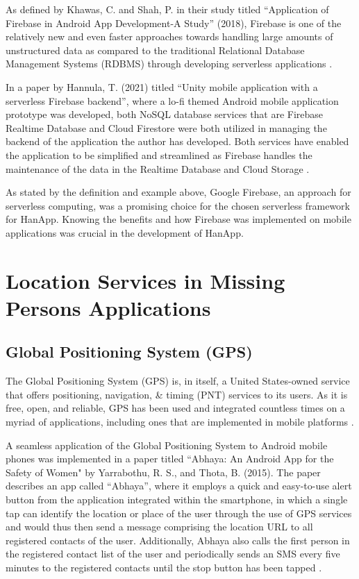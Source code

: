 As defined by Khawas, C. and Shah, P. in their study titled “Application of Firebase in Android App Development-A Study” (2018), Firebase is one of the relatively new and even faster approaches towards handling large amounts of unstructured data as compared to the traditional Relational Database Management Systems (RDBMS) through developing serverless applications 
\cite{khawas2018application}.

In a paper by Hannula, T. (2021) titled “Unity mobile application with a serverless Firebase backend”, where a lo-fi themed Android mobile application prototype was developed, both NoSQL database services that are Firebase Realtime Database and Cloud Firestore were both utilized in managing the backend of the application the author has developed. Both services have enabled the application to be simplified and streamlined as Firebase handles the maintenance of the data in the Realtime Database and Cloud Storage \cite{hannula2021unity}.

As stated by the definition and example above, Google Firebase, an approach for serverless computing, was a promising choice for the chosen serverless framework for HanApp. Knowing the benefits and how Firebase was implemented on mobile applications was crucial in the development of HanApp.


\section{Location Services in Missing Persons Applications}

\subsection{Global Positioning System (GPS)}

The Global Positioning System (GPS) is, in itself, a United States-owned service that offers positioning, navigation, \& timing (PNT) services to its users. As it is free, open, and reliable, GPS has been used and integrated countless times on a myriad of applications, including ones that are implemented in mobile platforms \cite{gpsGov}.

A seamless application of the Global Positioning System to Android mobile phones was implemented in a paper titled “Abhaya: An Android App for the Safety of Women" by Yarrabothu, R. S., and Thota, B. (2015). The paper describes an app called “Abhaya”, where it employs a quick and easy-to-use alert button from the application integrated within the smartphone, in which a single tap can identify the location or place of the user through the use of GPS services and would thus then send a message comprising the location URL to all registered contacts of the user. Additionally, Abhaya also calls the first person in the registered contact list of the user and periodically sends an SMS every five minutes to the registered contacts until the stop button has been tapped \cite{yarrabothu2015abhaya}.

